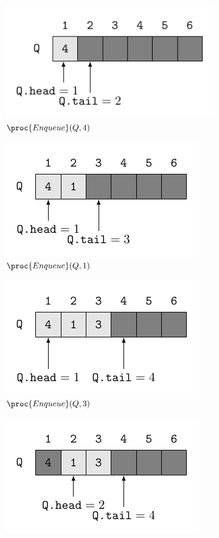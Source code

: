 \begin{description}
\begin{ex}
    \begin{figure}[H]
      \centering
      \begin{subfigure}[t]{.45\textwidth}
        \centering
        \includegraphics[scale=1]{img/10_1-3/10_1-3_1.pdf}
        \caption{$\proc{Enqueue}(Q,4)$}\label{fig:10_1-3_1}
      \end{subfigure}
      \begin{subfigure}[t]{.45\textwidth}
        \centering
        \includegraphics[scale=1]{img/10_1-3/10_1-3_2.pdf}
        \caption{$\proc{Enqueue}(Q,1)$}\label{fig:10_1-3_2}
      \end{subfigure}
      \begin{subfigure}[t]{.45\textwidth}
        \centering
        \includegraphics[scale=1]{img/10_1-3/10_1-3_3.pdf}
        \caption{$\proc{Enqueue}(Q,3)$}\label{fig:10_1-3_3}
      \end{subfigure}
      \begin{subfigure}[t]{.45\textwidth}
        \centering
        \includegraphics[scale=1]{img/10_1-3/10_1-3_4.pdf}

\end{subfigure}
\end{figure}
\end{ex}
\end{description}
